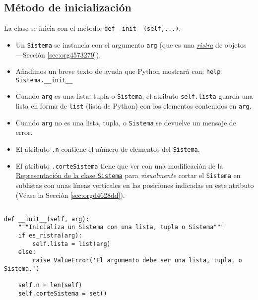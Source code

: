 \documentclass[11pt]{report}
\begin{document}
\subsection{Método de inicialización}
\label{sec:org2225fd7}

La clase se inicia con el método: \texttt{def\_\_init\_\_(self,...)}.

\begin{itemize}
\item Un \texttt{Sistema} se instancia con el argumento \texttt{arg} (que es una \hyperref[sec:org4573279]{\emph{ristra}} de objetos ---Sección
\ref{sec:org4573279}).

\item Añadimos un breve texto de ayuda que Python mostrará con: \texttt{help Sistema.\_\_init\_\_}

\item Cuando \texttt{arg} es una lista, tupla o \texttt{Sistema}, el atributo \texttt{self.lista} guarda una lista en forma
de \texttt{list} (lista de Python) con los elementos contenidos en \texttt{arg}.

\item Cuando \texttt{arg} no es una lista, tupla, o \texttt{Sistema} se devuelve un mensaje de error.

\item El atributo \texttt{.n} contiene el número de elementos del \texttt{Sistema}.

\item El atributo \texttt{.corteSistema} tiene que ver con una modificación de la \hyperref[sec:orgd4628dd]{Representación de la clase
\texttt{Sistema}} para \emph{visualmente} cortar el \texttt{Sistema} en sublistas con unas líneas verticales en las
posiciones indicadas en este atributo (Véase la Sección \ref{sec:orgd4628dd}).
\end{itemize}

\begin{verbatim}

def __init__(self, arg):
    """Inicializa un Sistema con una lista, tupla o Sistema"""
    if es_ristra(arg):
        self.lista = list(arg)
    else:
        raise ValueError('El argumento debe ser una lista, tupla, o Sistema.')
    
    self.n = len(self)
    self.corteSistema = set()

\end{verbatim}
\end{document}
